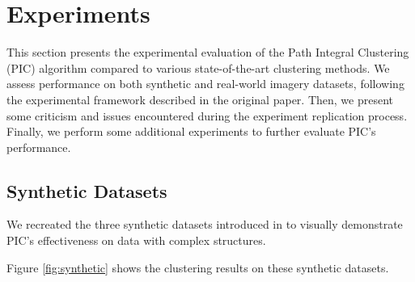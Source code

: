 \section{Experiments}
This section presents the experimental evaluation of the Path Integral Clustering (PIC) algorithm compared to various state-of-the-art clustering methods. We assess performance on both synthetic and real-world imagery datasets, following the experimental framework described in the original paper\cite{PIC}. Then, we present some criticism and issues encountered during the experiment replication process. Finally, we perform some additional experiments to further evaluate PIC's performance.

\subsection{Synthetic Datasets}
We recreated the three synthetic datasets introduced in \cite{PIC} to visually demonstrate PIC's effectiveness on data with complex structures.

Figure \ref{fig:synthetic} shows the clustering results on these synthetic datasets.

